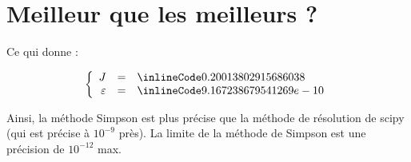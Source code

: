 \section{Meilleur que les meilleurs ?}

Ce qui donne :

\[
  \left\{
  \begin{array}{rcl}
    J           & = & \il{0.20013802915686038}   \\
    \varepsilon & = & \il{9.167238679541269e-10} \\
  \end{array}
  \right.
\]

Ainsi, la méthode Simpson est plus précise que la méthode de résolution de scipy
(qui est précise à $10^{-9}$ près).
La limite de la méthode de Simpson est une précision de $10^{-12}$ max.
